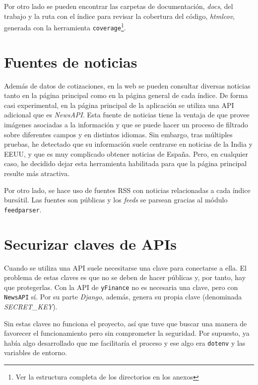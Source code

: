Por otro lado se pueden encontrar las carpetas de documentación, \emph{docs}, del trabajo y la ruta con el índice para revisar la cobertura del código, \emph{htmlcov}, generada con la herramienta \texttt{coverage}\footnote{Ver la estructura completa de los directorios en los anexos}.

 

\section{Fuentes de noticias}\label{noticias}

Además de datos de cotizaciones, en la web se pueden consultar diversas noticias tanto en la página principal como en la página general de cada índice. De forma casi experimental, en la página principal de la aplicación se utiliza una API adicional que es \emph{NewsAPI}. Esta fuente de noticias tiene la ventaja de que provee imágenes asociadas a la información y que se puede hacer un proceso de filtrado sobre diferentes campos y en distintos idiomas. Sin embargo, tras múltiples pruebas, he detectado que su información suele centrarse en noticias de la India y EEUU, y que es muy complicado obtener noticias de España. Pero, en cualquier caso, he decidido dejar esta herramienta habilitada para que la página principal resulte más atractiva.

Por otro lado, se hace uso de fuentes RSS con noticias relacionadas a cada índice bursátil. Las fuentes son públicas y los \emph{feeds} se parsean gracias al módulo \texttt{feedparser}\citep{online:feedparser}.


\section{Securizar claves de APIs}\label{noticias}

Cuando se utiliza una API suele necesitarse una clave para conectarse a ella. El problema de estas claves es que no se deben de hacer públicas y, por tanto, hay que protegerlas. Con la API de \texttt{yFinance} no es necesaria una clave, pero con \texttt{NewsAPI} sí. Por su parte \emph{Django}, además, genera su propia clave (denominada \emph{SECRET\_KEY}). 

Sin estas claves no funciona el proyecto, así que tuve que buscar una manera de favorecer el funcionamiento pero sin comprometer la seguridad. Por supuesto, ya había algo desarrollado que me facilitaría el proceso y ese algo era \texttt{dotenv} y las variables de entorno. 

